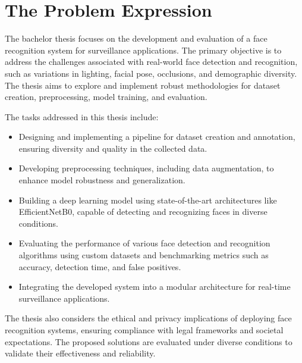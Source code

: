 \section{The Problem Expression}

The bachelor thesis focuses on the development and evaluation of a face recognition system for surveillance applications. The primary objective is to address the challenges associated with real-world face detection and recognition, such as variations in lighting, facial pose, occlusions, and demographic diversity. The thesis aims to explore and implement robust methodologies for dataset creation, preprocessing, model training, and evaluation.

The tasks addressed in this thesis include:
\begin{itemize}
    \item Designing and implementing a pipeline for dataset creation and annotation, ensuring diversity and quality in the collected data.
    \item Developing preprocessing techniques, including data augmentation, to enhance model robustness and generalization.
    \item Building a deep learning model using state-of-the-art architectures like EfficientNetB0, capable of detecting and recognizing faces in diverse conditions.
    \item Evaluating the performance of various face detection and recognition algorithms using custom datasets and benchmarking metrics such as accuracy, detection time, and false positives.
    \item Integrating the developed system into a modular architecture for real-time surveillance applications.
\end{itemize}

The thesis also considers the ethical and privacy implications of deploying face recognition systems, ensuring compliance with legal frameworks and societal expectations. The proposed solutions are evaluated under diverse conditions to validate their effectiveness and reliability.